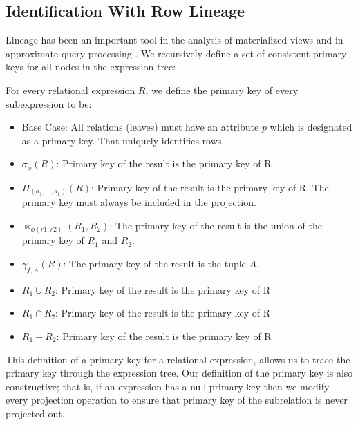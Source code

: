 \subsection{Identification With Row Lineage}
\label{lin}
Lineage has been an important tool in the analysis of materialized views \cite{DBLP:journals/vldb/CuiW03} and in approximate query processing \cite{DBLP:conf/sigmod/ZengGMZ14}. %
We recursively define a set of consistent primary keys for all nodes in the expression tree:
\begin{definition} 
For every relational expression $R$, we define the primary key of every subexpression to be:
\begin{itemize}[noitemsep]
\item Base Case: All relations (leaves) must have an attribute $p$ which is designated as a primary key. That uniquely identifies rows.
\item $\sigma_{\phi}(R)$: Primary key of the result is the primary key of R 
\item $\Pi_{(a_1,...,a_k)}(R)$: Primary key of the result is the primary key of R. The primary key must always be included in the projection.
\item $\bowtie_{\phi (r1,r2)}(R_1,R_2)$: The primary key of the result is the union of the primary key of $R_1$ and $R_2$. 
\item $\gamma_{f,A}(R)$: The primary key of the result is the tuple $A$.
\item $R_1 \cup R_2$: Primary key of the result is the primary key of R
\item $R_1 \cap R_2$: Primary key of the result is the primary key of R
\item $R_1 - R_2$: Primary key of the result is the primary key of R
\end{itemize}
\end{definition}
This definition of a primary key for a relational expression, allows us to trace the primary key through the expression tree.
Our definition of the primary key is also constructive; that is, if an expression has a null primary key then we modify every projection operation to ensure that primary key of the subrelation is never projected out.

